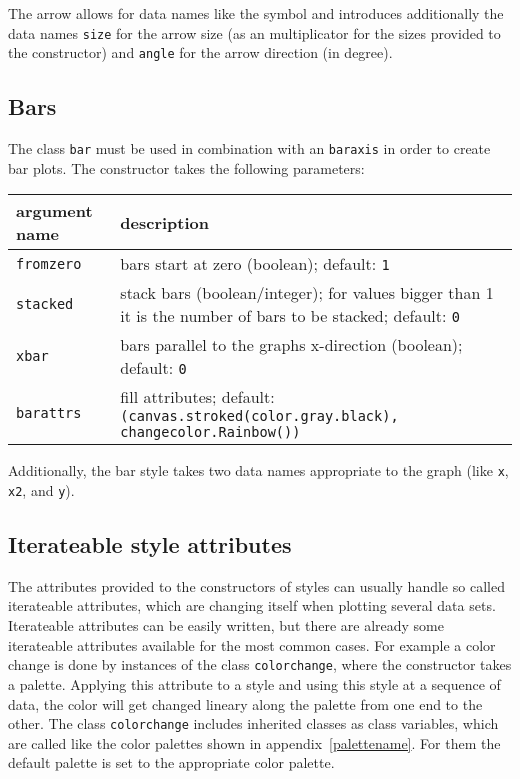 The arrow allows for data names like the symbol and introduces
additionally the data names \verb|size| for the arrow size (as an
multiplicator for the sizes provided to the constructor) and
\verb|angle| for the arrow direction (in degree).

\subsection{Bars}

The class \verb|bar| must be used in combination with an
\verb|baraxis| in order to create bar plots. The constructor takes the
following parameters:

\medskip
\begin{tabularx}{\linewidth}{l>{\raggedright\arraybackslash}X}
argument name&description\\
\hline
\texttt{fromzero}&bars start at zero (boolean); default: \texttt{1}\\
\texttt{stacked}&stack bars (boolean/integer); for values bigger than 1 it is the number of bars to be stacked; default: \texttt{0}\\
\texttt{xbar}&bars parallel to the graphs x-direction (boolean); default: \texttt{0}\\
\texttt{barattrs}&fill attributes; default: \texttt{(canvas.stroked(color.gray.black), changecolor.Rainbow())}\\
\end{tabularx}

Additionally, the bar style takes two data names appropriate to the
graph (like \verb|x|, \verb|x2|, and \verb|y|).

\subsection{Iterateable style attributes}
\label{graph:changeattrs}

The attributes provided to the constructors of styles can usually
handle so called iterateable attributes, which are changing itself
when plotting several data sets. Iterateable attributes can be easily
written, but there are already some iterateable attributes available
for the most common cases. For example a color change is done by
instances of the class \verb|colorchange|, where the constructor takes
a palette. Applying this attribute to a style and using this style at
a sequence of data, the color will get changed lineary along the
palette from one end to the other. The class \verb|colorchange|
includes inherited classes as class variables, which are called like
the color palettes shown in appendix~\ref{palettename}. For them the
default palette is set to the appropriate color palette.

